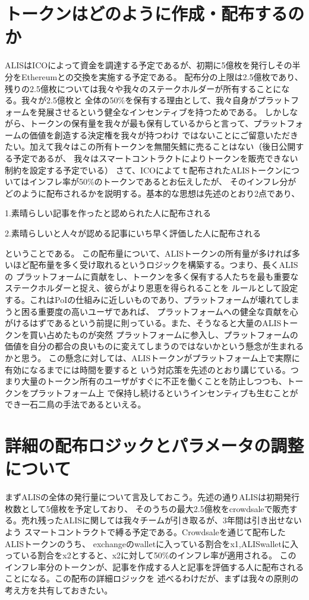 \documentclass{jsarticle}
\begin{document}
\section{トークンはどのように作成・配布するのか}
ALISはICOによって資金を調達する予定であるが、初期に5億枚を発行しその半分をEthereumとの交換を実施する予定である。
配布分の上限は2.5億枚であり、残りの2.5億枚については我々や我々のステークホルダーが所有することになる。我々が2.5億枚と
全体の50\%を保有する理由として、我々自身がプラットフォームを発展させるという健全なインセンティブを持つためである。
しかしながら、トークンの保有量を我々が最も保有しているからと言って、プラットフォームの価値を創造する決定権を我々が持つわけ
ではないことにご留意いただきたい。加えて我々はこの所有トークンを無闇矢鱈に売ることはない（後日公開する予定であるが、
我々はスマートコントラクトによりトークンを販売できない制約を設定する予定でいる）
さて、ICOによてｔ配布されたALISトークンについてはインフレ率が50\%のトークンであるとお伝えしたが、
そのインフレ分がどのように配布されるかを説明する。基本的な思想は先述のとおり2点であり、

1.素晴らしい記事を作ったと認められた人に配布される 

2.素晴らしいと人々が認める記事にいち早く評価した人に配布される

ということである。
この配布量について、ALISトークンの所有量が多ければ多いほど配布量を多く受け取れるというロジックを構築する。つまり、長くALISの
プラットフォームに貢献をし、トークンを多く保有する人たちを最も重要なステークホルダーと捉え、彼らがより恩恵を得られることを
ルールとして設定する。これはPoIの仕組みに近しいものであり、プラットフォームが壊れてしまうと困る重要度の高いユーザであれば、
プラットフォームへの健全な貢献を心がけるはずであるという前提に則っている。また、そうなると大量のALISトークンを買い占めたものが突然
プラットフォームに参入し、プラットフォームの価値を自分の都合の良いものに変えてしまうのではないかという懸念が生まれるかと思う。
この懸念に対しては、ALISトークンがプラットフォーム上で実際に有効になるまでには時間を要すると
いう対応策を先述のとおり講じている。つまり大量のトークン所有のユーザがすぐに不正を働くことを防止しつつも、トークンをプラットフォーム上
で保持し続けるというインセンティブも生むことができ一石二鳥の手法であるといえる。
\section{詳細の配布ロジックとパラメータの調整について}
まずALISの全体の発行量について言及しておこう。先述の通りALISは初期発行枚数として5億枚を予定しており、
そのうちの最大2.5億枚をcrowdsaleで販売する。売れ残ったALISに関しては我々チームが引き取るが、3年間は引き出せないよう
スマートコントラクトで縛る予定である。Crowdsaleを通じて配布したALISトークンのうち、
exchangeのwalletに入っている割合をx1,ALISwalletに入っている割合をx2とすると、x2に対して50\%のインフレ率が適用される。
このインフレ率分のトークンが、記事を作成する人と記事を評価する人に配布されることになる。この配布の詳細ロジックを
述べるわけだが、まずは我々の原則の考え方を共有しておきたい。
\end{document}
